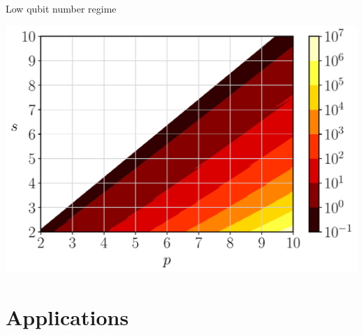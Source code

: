 \documentclass[9pt, handout, aspectratio=169]{beamer}	%
\begin{document}
\begin{frame}{Low qubit number regime}
\begin{multicols}{2}
		\begin{center}
			\includegraphics[width=.40\paperwidth]{Figures/efficiency}
		\end{center}

	\end{multicols}

\end{frame}


\section{Applications}
\end{document}

